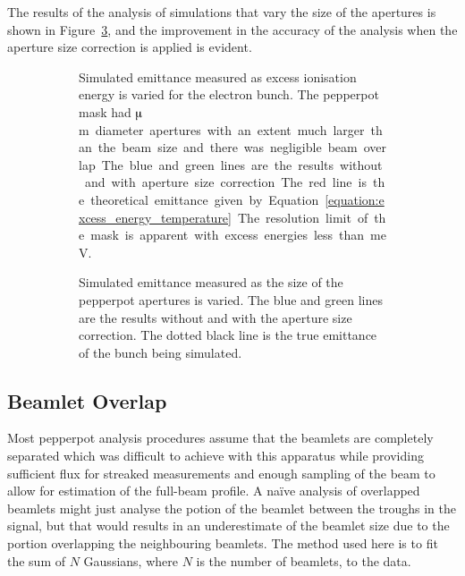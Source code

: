 The results of the analysis of simulations that vary the size of the apertures is shown in Figure~\ref{figure:aperture_size_sim}, and the improvement in the accuracy of the analysis when the aperture size correction is applied is evident.

\begin{figure}
\begin{subfigure}[b]{\textwidth}
    \center
    
    \caption[Results of a simulation investigating the efficacy of the aperture size correction for various electron excess energies.]{Simulated emittance measured as excess ionisation energy is varied for the electron bunch.
    The pepperpot mask had \unit[50]{$\muup$m} diameter apertures with an extent much larger than the beam size and there was negligible beam overlap.
    The blue and green lines are the results without and with aperture size correction.
    The red line is the theoretical emittance given by Equation~\ref{equation:excess_energy_temperature}.
    The resolution limit of the mask is apparent with excess energies less than \unit[10]{meV}.}
    \label{figure:wavelength_sim}
\end{subfigure}

\begin{subfigure}[b]{\textwidth}
    \center
    
    \caption[Results of a simulation investigating the efficacy of the aperture size correction for various aperture sizes.]{Simulated emittance measured as the size of the pepperpot apertures is varied. The blue and green lines are the results without and with the aperture size correction. The dotted black line is the true emittance of the bunch being simulated.}
    \label{figure:aperture_size_sim}
\end{subfigure}
    \caption[Results of a simulations investigating the efficacy of the aperture size correction for various excess energies and aperture sizes.]{}
\end{figure}

\subsection{Beamlet Overlap}\label{section:overlap_correction}
Most pepperpot analysis procedures assume that the beamlets are completely separated which was difficult to achieve with this apparatus while providing sufficient flux for streaked measurements and enough sampling of the beam to allow for estimation of the full-beam profile.
A na\"ive analysis of overlapped beamlets might just analyse the potion of the beamlet between the troughs in the signal, but that would results in an underestimate of the beamlet size due to the portion overlapping the neighbouring beamlets.
The method used here is to fit the sum of $N$ Gaussians, where $N$ is the number of beamlets, to the data.

